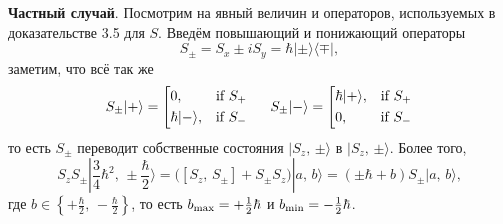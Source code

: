 \textbf{Частный случай}. Посмотрим на явный величин и операторов, используемых в доказательстве 3.5 для $S$. Введём повышающий и понижающий операторы
\begin{equation*}
    S_{\pm} = S_x \pm i S_y = \hbar | \pm \rangle \langle \mp |,
\end{equation*}
заметим, что всё так же
\begin{align*}
    S_{\pm} | +\rangle = \left[\begin{aligned}
        &0, &\text{if }S_+ \\
        &\hbar | -\rangle, &\text{if }S_- \\
    \end{aligned}\right.
    \hspace{5 mm} 
    S_{\pm} | -\rangle = \left[\begin{aligned}
        &\hbar | +\rangle, &\text{if }S_+ \\
        &0, &\text{if }S_- \\
    \end{aligned}\right.
\end{align*}
то есть $S_{\pm}$ переводит собственные состояния $|S_z,\, \pm \rangle$ в $|S_z,\, \pm \rangle$. Более того, 
\begin{equation*}
    S_z S_{\pm} | \textstyle \frac{3}{4} \hbar^2,\, \pm \textstyle \frac{\hbar}{2}\rangle = \bigg(
        \left[S_z,\, S_{\pm}\right] + S_{\pm} S_z
    \bigg) | a,\, b\rangle = 
    \left(\pm \hbar + b\right)S_{\pm} | a,\, b\rangle,
\end{equation*}
где $b \in \left\{+ \textstyle \frac{\hbar}{2},\, - \textstyle \frac{\hbar}{2}\right\}$, то есть $b_{\textnormal{max}} = + \textstyle \frac{1}{2} \hbar$ и $b_{\textnormal{min}} = - \textstyle \frac{1}{2} \hbar$. 

